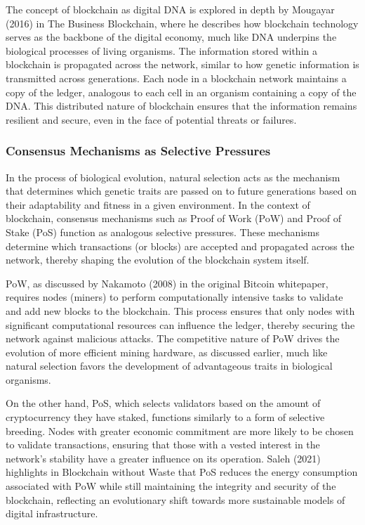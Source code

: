 \documentclass[12pt,twoside]{article}
\begin{document}
The concept of blockchain as digital DNA is explored in depth by Mougayar (2016) in The Business Blockchain, where he describes how blockchain technology serves as the backbone of the digital economy, much like DNA underpins the biological processes of living organisms. The information stored within a blockchain is propagated across the network, similar to how genetic information is transmitted across generations. Each node in a blockchain network maintains a copy of the ledger, analogous to each cell in an organism containing a copy of the DNA. This distributed nature of blockchain ensures that the information remains resilient and secure, even in the face of potential threats or failures.

\subsubsection{Consensus Mechanisms as Selective Pressures}

In the process of biological evolution, natural selection acts as the mechanism that determines which genetic traits are passed on to future generations based on their adaptability and fitness in a given environment. In the context of blockchain, consensus mechanisms such as Proof of Work (PoW) and Proof of Stake (PoS) function as analogous selective pressures. These mechanisms determine which transactions (or blocks) are accepted and propagated across the network, thereby shaping the evolution of the blockchain system itself.

PoW, as discussed by Nakamoto (2008) in the original Bitcoin whitepaper, requires nodes (miners) to perform computationally intensive tasks to validate and add new blocks to the blockchain. This process ensures that only nodes with significant computational resources can influence the ledger, thereby securing the network against malicious attacks. The competitive nature of PoW drives the evolution of more efficient mining hardware, as discussed earlier, much like natural selection favors the development of advantageous traits in biological organisms.

On the other hand, PoS, which selects validators based on the amount of cryptocurrency they have staked, functions similarly to a form of selective breeding. Nodes with greater economic commitment are more likely to be chosen to validate transactions, ensuring that those with a vested interest in the network’s stability have a greater influence on its operation. Saleh (2021) highlights in Blockchain without Waste that PoS reduces the energy consumption associated with PoW while still maintaining the integrity and security of the blockchain, reflecting an evolutionary shift towards more sustainable models of digital infrastructure.
\end{document}
